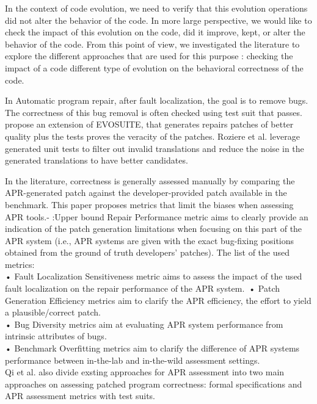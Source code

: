  In the context of code evolution, we need to verify that this evolution operations did not alter the behavior of the code. 
 In more large perspective, we would like to check the impact of this evolution on the code, did it improve, kept, or alter the behavior of the code. From this point of view, we investigated the literature to explore the different approaches that are used for this purpose : checking the impact of a code different type of evolution on the behavioral correctness of the code.
 
In Automatic program repair, after fault localization, the goal is to remove bugs. The correctness of this bug removal is often checked using test suit that passes.
\cite{10638555} propose an extension of EVOSUITE, that generates repairs patches of better quality plus the tests proves the veracity of the patches.
Roziere et al. \cite{roziere2021leveraging} leverage generated unit tests to filter out invalid translations and reduce the noise in the generated translations to have better candidates.


In the literature, correctness is generally assessed manually by comparing the APR-generated patch against the developer-provided patch available in the benchmark. This paper proposes metrics that limit the biases when assessing APR tools.- :Upper bound Repair Performance metric aims to clearly provide an indication of the patch generation limitations when focusing on this part of the APR system (i.e., APR systems are given with the exact bug-fixing positions obtained from the ground of truth developers’ patches). The list of the used metrics:\\
• Fault Localization Sensitiveness metric aims to assess the impact of the used fault localization on the repair performance of the APR system.\
• Patch Generation Efficiency metrics aim to clarify the APR efficiency, the effort to yield a plausible/correct patch.\\
• Bug Diversity metrics aim at evaluating APR system performance from intrinsic attributes of bugs.\\
• Benchmark Overfitting metrics aim to clarify the difference of APR systems performance between in-the-lab and in-the-wild assessment settings.\\

Qi et al. \cite{8612557} also divide exsting approaches for APR assessment into two main approaches on assessing patched program correctness: formal specifications and APR assessment metrics with test suits.

